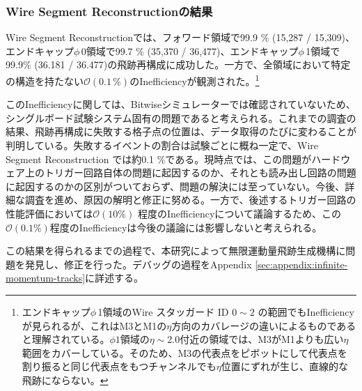 \subsubsection*{Wire Segment Reconstructionの結果}
Wire Segment Reconstructionでは、フォワード領域で99.9 \% (15,287 / 15,309)、エンドキャップ$\phi\,$0領域で99.7 \% (35,370 / 36,477)、エンドキャップ$\phi\,$1領域で99.9\% (36.181 / 36.477)の飛跡再構成に成功した。一方で、全領域において特定の構造を持たない$\mathcal{O}(0.1\,\%)$のInefficiencyが観測された。\footnote{エンドキャップ$\phi\,$1領域のWire スタッガード ID $0 \sim 2$ の範囲でもInefficiencyが見られるが、これはM3とM1の$\eta$方向のカバレージの違いによるものであると理解されている。$\phi1$領域の$\eta\sim$2.0付近の領域では、M3がM1よりも広い$\eta$範囲をカバーしている。そのため、M3の代表点をピボットにして代表点を割り振ると同じ代表点をもつチャンネルでも$\eta$位置にずれが生じ、直線的な飛跡にならない。
}

このInefficiencyに関しては、Bitwiseシミュレーターでは確認されていないため、シングルボード試験システム固有の問題であると考えられる。これまでの調査の結果、飛跡再構成に失敗する格子点の位置は、データ取得のたびに変わることが判明している。失敗するイベントの割合は試験ごとに概ね一定で、Wire Segment Reconstruction では約0.1 \%である。現時点では、この問題がハードウェア上のトリガー回路自体の問題に起因するのか、それとも読み出し回路の問題に起因するのかの区別がついておらず、問題の解決には至っていない。今後、詳細な調査を進め、原因の解明と修正に努める。一方で、後述するトリガー回路の性能評価においては$\mathcal{O}(10 \%)$ 程度のInefficiencyについて議論するため、この$\mathcal{O}(0.1 \%)$程度のInefficiencyは今後の議論には影響しないと考えられる。

この結果を得られるまでの過程で、本研究によって無限運動量飛跡生成機構に問題を発見し、修正を行った。デバッグの過程をAppendix \ref{sec:appendix:infinite-momentum-tracks}に詳述する。


